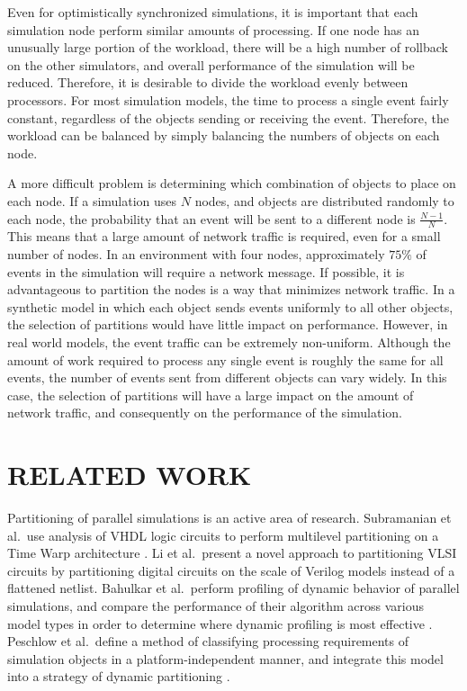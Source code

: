 \documentclass{wscpaperproc}
\begin{document}
Even for optimistically synchronized simulations, it is important that each simulation node perform similar amounts of processing. If one node has an unusually large portion of the workload, there will be a high number of rollback on the other simulators, and overall performance of the simulation will be reduced. Therefore, it is desirable to divide the workload evenly between processors. For most simulation models, the time to process a single event fairly constant, regardless of the objects sending or receiving the event. Therefore, the workload can be balanced by simply balancing the numbers of objects on each node.

A more difficult problem is determining which combination of objects to place on each node. If a simulation uses \(N\) nodes, and objects are distributed randomly to each node, the probability that an event will be sent to a different node is \(\frac{N-1}{N}\). This means that a large amount of network traffic is required, even for a small number of nodes. In an environment with four nodes, approximately \(75\%\) of events in the simulation will require a network message. If possible, it is advantageous to partition the nodes is a way that minimizes network traffic. In a synthetic model in which each object sends events uniformly to all other objects, the selection of partitions would have little impact on performance. However, in real world models, the event traffic can be extremely non-uniform. Although the amount of work required to process any single event is roughly the same for all events, the number of events sent from different objects can vary widely. In this case, the selection of partitions will have a large impact on the amount of network traffic, and consequently on the performance of the simulation.


\section{RELATED WORK}\label{sec:related}


Partitioning of parallel simulations is an active area of research. Subramanian et al.\ use analysis of VHDL logic circuits to perform multilevel partitioning on a Time Warp architecture \cite{subramanian-01}. Li et al.\ present a novel approach to partitioning VLSI circuits by partitioning digital circuits on the scale of Verilog models instead of a flattened netlist. Bahulkar et al.\ perform profiling of dynamic behavior of parallel simulations, and compare the performance of their algorithm across various model types in order to determine where dynamic profiling is most effective \cite{bahulkar-12}. Peschlow et al.\ define a method of classifying processing requirements of simulation objects in a platform-independent manner, and integrate this model into a strategy of dynamic partitioning \cite{peschlow-07}.
\end{document}
